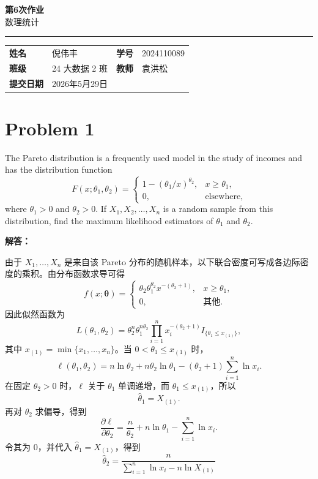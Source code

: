\documentclass[12pt,a4paper]{article}
\newcommand{\course}{数理统计}
\newcommand{\homeworktitle}{第6次作业}
\newcommand{\studentname}{倪伟丰}
\newcommand{\studentid}{2024110089}
\newcommand{\classname}{24 大数据 2 班}
\newcommand{\teacher}{袁洪松}
\newcommand{\duedate}{2026年5月29日}
\begin{document}
\begin{center}
  {\Huge\bfseries\color{mainblue}\homeworktitle}\\[0.6em]
  {\Large\course}\\[1.2em]
  {\color{linegray}\rule{0.9\textwidth}{0.8pt}}
\end{center}

\begin{infobox}
\begin{tabularx}{\textwidth}{>{\bfseries}p{2.2cm} X >{\bfseries}p{2.2cm} X}
姓名 & \studentname & 学号 & \studentid \\
班级 & \classname & 教师 & \teacher \\
提交日期 & \duedate &  &  \\
\end{tabularx}
\end{infobox}

\section{Problem 1}

The Pareto distribution is a frequently used model in the study of incomes and has the distribution function
\[
F(x;\theta_1,\theta_2)=
\begin{cases}
1-(\theta_1/x)^{\theta_2}, & x\geq \theta_1,\\
0, & \text{elsewhere},
\end{cases}
\]
where $\theta_1>0$ and $\theta_2>0$. If $X_1,X_2,\ldots,X_n$ is a random sample from this distribution, find the maximum likelihood estimators of $\theta_1$ and $\theta_2$.

\begin{answerbox}
\textbf{解答：}

由于 $X_1,\ldots,X_n$ 是来自该 Pareto 分布的随机样本，以下联合密度可写成各边际密度的乘积。由分布函数求导可得
\[
f(x;\boldsymbol\theta)=
\begin{cases}
\theta_2\theta_1^{\theta_2}x^{-(\theta_2+1)}, & x\geq \theta_1,\\
0, & \text{其他}.
\end{cases}
\]
因此似然函数为
\[
L(\theta_1,\theta_2)
=\theta_2^n\theta_1^{n\theta_2}\prod_{i=1}^n x_i^{-(\theta_2+1)}
 I_{\{\theta_1\leq x_{(1)}\}},
\]
其中 $x_{(1)}=\min\{x_1,\ldots,x_n\}$。当 $0<\theta_1\leq x_{(1)}$ 时，
\[
\ell(\theta_1,\theta_2)
=n\ln\theta_2+n\theta_2\ln\theta_1-(\theta_2+1)\sum_{i=1}^n\ln x_i.
\]
在固定 $\theta_2>0$ 时，$\ell$ 关于 $\theta_1$ 单调递增，而 $\theta_1\leq x_{(1)}$，所以
\[
\hat\theta_1=X_{(1)}.
\]
再对 $\theta_2$ 求偏导，得到
\[
\frac{\partial \ell}{\partial \theta_2}
=\frac{n}{\theta_2}+n\ln\theta_1-\sum_{i=1}^n\ln x_i.
\]
令其为 $0$，并代入 $\hat\theta_1=X_{(1)}$，得到
\[
\hat\theta_2
=\frac{n}{\sum_{i=1}^n\ln x_i-n\ln X_{(1)}}
\]
\end{answerbox}
\end{document}
